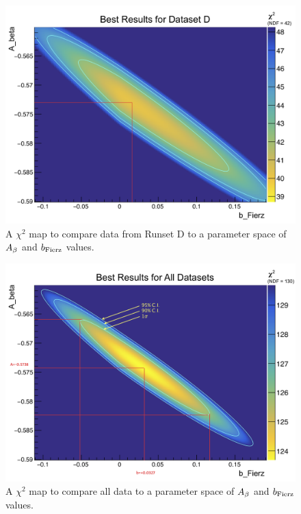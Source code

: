 \begin{figure}[h!tb]
	\centering
	\includegraphics[width=.999\linewidth]
	{Figures/Chi2_2D_SetD.png}
	\caption[$\chi^2$ Map for Runset D]{A $\chi^2$ map to compare data from Runset D to a parameter space of $A_{\beta}$ and $b_{\mathrm{Fierz}}$ values.}	
	\label{fig:2dchi2_setD}
\end{figure}
%
\begin{figure}[h!tb]
	\centering
	\includegraphics[width=.999\linewidth]
	{Figures/Chi2_2D_AllData.png}
	\caption[$\chi^2$ Map for All Data]{A $\chi^2$ map to compare all data to a parameter space of $A_{\beta}$ and $b_{\mathrm{Fierz}}$ values.}	
	\label{fig:2dchi2_alldata}
\end{figure}
%


